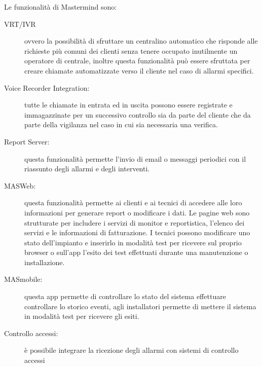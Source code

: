 Le funzionalità di Mastermind sono:
\begin{description}
	\item[VRT/IVR] ovvero la possibilità di sfruttare un centralino automatico che risponde alle richieste più comuni dei clienti senza tenere occupato inutilmente un operatore di centrale, inoltre questa funzionalità può essere sfruttata per creare chiamate automatizzate verso il cliente nel caso di allarmi specifici.
	\item[Voice Recorder Integration:] tutte le chiamate in entrata ed in uscita possono essere registrate e immagazzinate per un successivo controllo sia da parte del cliente che da parte della vigilanza nel caso in cui sia necessaria una verifica.
	\item[Report Server:] questa funzionalità permette l'invio di email o messaggi periodici con il riassunto degli allarmi e degli interventi.
	\item[MASWeb:] questa funzionalità permette ai clienti e ai tecnici di accedere alle loro informazioni per generare report o modificare i dati. Le pagine web sono strutturate per includere i servizi di monitor e reportistica, l'elenco dei servizi e le informazioni di fatturazione. I tecnici possono modificare uno stato dell'impianto e inserirlo in modalità test per ricevere sul proprio browser o sull'app l'esito dei test effettuati durante una manutenzione o installazione.
	\item[MASmobile:] questa app permette di controllare lo stato del sistema effettuare controllare lo storico eventi, agli installatori permette di mettere il sistema in modalità test per ricevere gli esiti.
	\item[Controllo accessi:] è possibile integrare la ricezione degli allarmi con sistemi di controllo accessi 
\end{description}